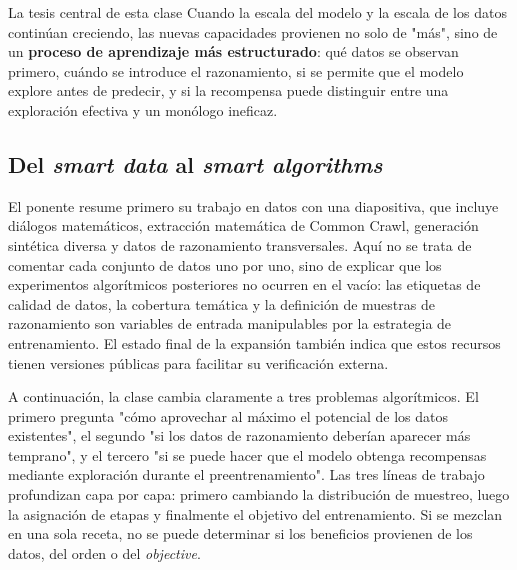 \begin{importantbox}{La tesis central de esta clase}
Cuando la escala del modelo y la escala de los datos continúan creciendo, las nuevas capacidades provienen no solo de "más", sino de un \textbf{proceso de aprendizaje más estructurado}: qué datos se observan primero, cuándo se introduce el razonamiento, si se permite que el modelo explore antes de predecir, y si la recompensa puede distinguir entre una exploración efectiva y un monólogo ineficaz.
\end{importantbox}

\subsection{Del \textit{smart data} al \textit{smart algorithms}}

El ponente resume primero su trabajo en datos con una diapositiva, que incluye diálogos matemáticos, extracción matemática de Common Crawl, generación sintética diversa y datos de razonamiento transversales. Aquí no se trata de comentar cada conjunto de datos uno por uno, sino de explicar que los experimentos algorítmicos posteriores no ocurren en el vacío: las etiquetas de calidad de datos, la cobertura temática y la definición de muestras de razonamiento son variables de entrada manipulables por la estrategia de entrenamiento. El estado final de la expansión también indica que estos recursos tienen versiones públicas para facilitar su verificación externa.


A continuación, la clase cambia claramente a tres problemas algorítmicos. El primero pregunta "cómo aprovechar al máximo el potencial de los datos existentes", el segundo "si los datos de razonamiento deberían aparecer más temprano", y el tercero "si se puede hacer que el modelo obtenga recompensas mediante exploración durante el preentrenamiento". Las tres líneas de trabajo profundizan capa por capa: primero cambiando la distribución de muestreo, luego la asignación de etapas y finalmente el objetivo del entrenamiento. Si se mezclan en una sola receta, no se puede determinar si los beneficios provienen de los datos, del orden o del \textit{objective}.


